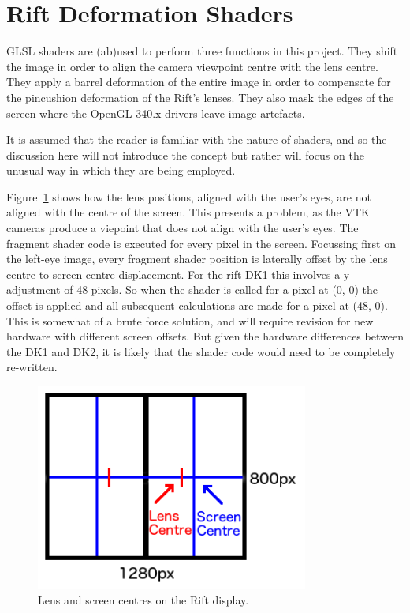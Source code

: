 \documentclass[MSc,paper=a4,pagesize=auto]{icldt}
\begin{document}
\section{Rift Deformation Shaders}
GLSL shaders are (ab)used to perform three functions in this project. They shift the image in order to align the camera viewpoint centre with the lens centre. They apply a barrel deformation of the entire image in order to compensate for the pincushion deformation of the Rift's lenses.  They also mask the edges of the screen where the OpenGL 340.x drivers leave image artefacts. 


It is assumed that the reader is familiar with the nature of shaders, and so the discussion here will not introduce the concept but rather will focus on the unusual way in which they are being employed. 

Figure~\ref{fig:rift_screen} shows how the lens positions, aligned with the user's eyes, are not aligned with the centre of the screen. This presents a problem, as the VTK cameras produce a viepoint that does not align with the user's eyes. The fragment shader code is executed for every pixel in the screen. Focussing first on the left-eye image, every fragment shader position is laterally offset by the lens centre to screen centre displacement. For the rift DK1 this involves a y-adjustment of 48 pixels. So when the shader is called for a pixel at (0, 0) the offset is applied and all subsequent calculations are made for a pixel at (48, 0). This is somewhat of a brute force solution, and will require revision for new hardware with different screen offsets. But given the hardware differences between the DK1 and DK2, it is likely that the shader code would need to be completely re-written.

\begin{figure}[htbp!]
    \centering
    \includegraphics[width=0.8\textwidth]{resources/rift_screen}
    \caption{Lens and screen centres on the Rift display.}
    \label{fig:rift_screen}
\end{figure}
\end{document}
